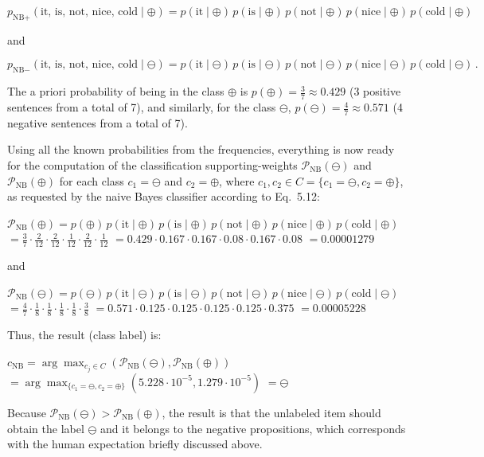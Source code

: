 \[
p_{\text{NB}+}(\text{it, is, not, nice, cold} \mid \oplus) =
p(\text{it} \mid \oplus) \, 
p(\text{is} \mid \oplus) \, 
p(\text{not} \mid \oplus) \, 
p(\text{nice} \mid \oplus) \, 
p(\text{cold} \mid \oplus)
\]

and

\[
p_{\text{NB}-}(\text{it, is, not, nice, cold} \mid \ominus) =
p(\text{it} \mid \ominus) \,
p(\text{is} \mid \ominus) \,
p(\text{not} \mid \ominus) \,
p(\text{nice} \mid \ominus) \,
p(\text{cold} \mid \ominus) \,.
\]

The a priori probability of being in the class $\oplus$ is $p(\oplus) = \frac{3}{7} \approx 0.429$ 
(3 positive sentences from a total of 7), and similarly, 
for the class $\ominus$, $p(\ominus) = \frac{4}{7} \approx 0.571$ 
(4 negative sentences from a total of 7).

Using all the known probabilities from the frequencies, everything is now
ready for the computation of the classification supporting-weights 
$\mathcal{P}_{\text{NB}}(\ominus)$ and $\mathcal{P}_{\text{NB}}(\oplus)$ 
for each class $c_1 = \ominus$ and $c_2 = \oplus$, 
where $c_1, c_2 \in C = \{c_1 = \ominus, c_2 = \oplus\}$, 
as requested by the naive Bayes classifier according to Eq.~5.12:

$\mathcal{P}_{\text{NB}}(\oplus) = p(\oplus) \, p(\text{it} \mid \oplus) \, p(\text{is} \mid \oplus) \, p(\text{not} \mid \oplus) \, p(\text{nice} \mid \oplus) \, p(\text{cold} \mid \oplus)$
$= \frac{3}{7} \cdot \frac{2}{12} \cdot \frac{2}{12} \cdot \frac{1}{12} \cdot \frac{2}{12} \cdot \frac{1}{12}$
$= 0.429 \cdot 0.167 \cdot 0.167 \cdot 0.08 \cdot 0.167 \cdot 0.08$
$= 0.00001279$

and

$\mathcal{P}_{\text{NB}}(\ominus) = p(\ominus) \, p(\text{it} \mid \ominus) \, p(\text{is} \mid \ominus) \, p(\text{not} \mid \ominus) \, p(\text{nice} \mid \ominus) \, p(\text{cold} \mid \ominus)$
$= \frac{4}{7} \cdot \frac{1}{8} \cdot \frac{1}{8} \cdot \frac{1}{8} \cdot \frac{1}{8} \cdot \frac{3}{8}$
$= 0.571 \cdot 0.125 \cdot 0.125 \cdot 0.125 \cdot 0.125 \cdot 0.375$
$= 0.00005228$

Thus, the result (class label) is:

$c_{\text{NB}} = \arg\max_{c_j \in C} (\mathcal{P}_{\text{NB}}(\ominus), \mathcal{P}_{\text{NB}}(\oplus))$
$= \arg\max_{\{c_1 = \ominus, c_2 = \oplus\}} (5.228 \cdot 10^{-5}, 1.279 \cdot 10^{-5})$
$= \ominus$

Because $\mathcal{P}_{\text{NB}}(\ominus) > \mathcal{P}_{\text{NB}}(\oplus)$, 
the result is that the unlabeled item should obtain the label $\ominus$ 
and it belongs to the negative propositions, 
which corresponds with the human expectation briefly discussed above.

